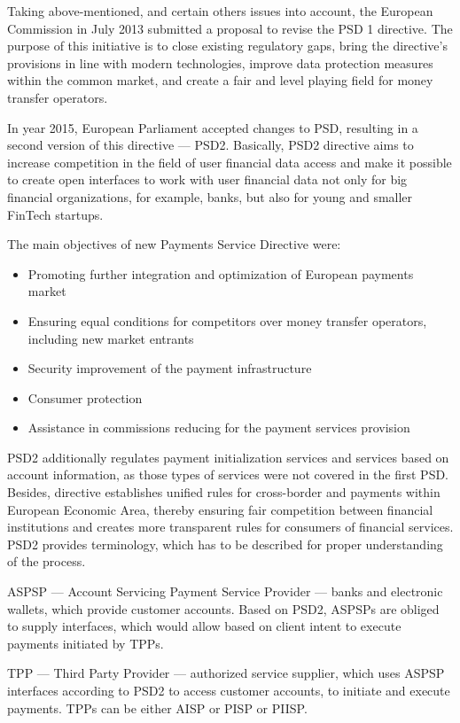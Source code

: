 Taking above-mentioned, and certain others issues into account, the European Commission in July 2013 submitted a proposal to revise the PSD 1 directive. The purpose of this initiative is to close existing regulatory gaps, bring the directive's provisions in line with modern technologies, improve data protection measures within the common market, and create a fair and level playing field for money transfer operators.

In year 2015, European Parliament accepted changes to PSD, resulting in a second version of this directive — PSD2.
\cite{psd2}
Basically, PSD2 directive aims to increase competition in the field of user financial data access and make it possible to create open interfaces to work with user financial data not only for big financial organizations, for example, banks, but also for young and smaller FinTech startups.

The main objectives of new Payments Service Directive were:
\begin{itemize}
    \item Promoting further integration and optimization of European payments market
    \item Ensuring equal conditions for competitors over money transfer operators, including new market entrants
    \item Security improvement of the payment infrastructure
    \item Consumer protection
    \item Assistance in commissions reducing for the payment services provision
\end{itemize}

PSD2 additionally regulates payment initialization services and services based on account information, as those types of services were not covered in the first PSD.
Besides, directive establishes unified rules for cross-border and payments within European Economic Area, thereby ensuring fair competition between financial institutions and creates more transparent rules for consumers of financial services.
PSD2 provides terminology, which has to be described for proper understanding of the process.

ASPSP — Account Servicing Payment Service Provider — banks and electronic wallets, which provide customer accounts. Based on PSD2, ASPSPs are obliged to supply interfaces, which would allow based on client intent to execute payments initiated by TPPs.

TPP — Third Party Provider — authorized service supplier, which uses ASPSP interfaces according to PSD2 to access customer accounts, to initiate and execute payments.
TPPs can be either AISP or PISP or PIISP.

